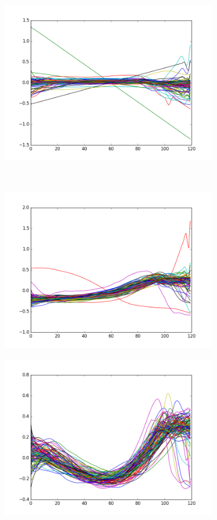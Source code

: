 \documentclass[12pt]{article}
\begin{document}
\begin{figure}[htb]
	\centering
	\begin{subfigure}[b]{0.49\textwidth}
	    \includegraphics[width=\textwidth]{best-0}
	\end{subfigure}
	~
	\begin{subfigure}[b]{0.49\textwidth}
    	\includegraphics[width=\textwidth]{best-1}
	\end{subfigure}
	\begin{subfigure}[b]{0.49\textwidth}
	    \includegraphics[width=\textwidth]{best-2}

\end{subfigure}
\end{figure}
\end{document}
